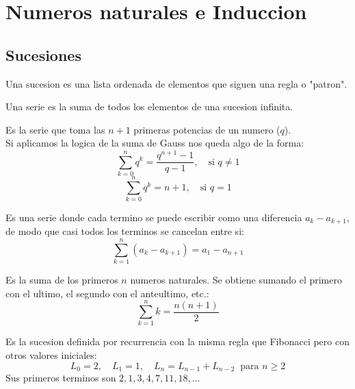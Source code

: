 \chapter{Numeros naturales e Induccion}

\section{Sucesiones}

\begin{definicion}[title= Definicion de sucesion]
    Una sucesion es una lista ordenada de elementos que siguen una regla o "patron".
\end{definicion}

\begin{definicion}[title= Definicion de serie]
    Una serie es la suma de todos los elementos de una sucesion infinita.
\end{definicion}

\begin{definicion}[title= Definicion de serie geometrica]
    Es la serie que toma las $n+1$ primeras potencias de un numero ($q$). \\
    Si aplicamos la logica de la suma de Gauss nos queda algo de la forma:
\[
    \sum_{k=0}^{n} q^k = \frac{q^{n+1}-1}{q-1}, \quad \text{si } q\neq 1
\]
\[
    \sum_{k=0}^{n} q^k = n+1, \quad \text{si } q=1
\]
\end{definicion}

\begin{definicion}[title= Definicion de serie telescopica]
    Es una serie donde cada termino se puede escribir como una diferencia $a_k - a_{k+1}$, de modo que casi todos los terminos se cancelan entre si:
\[
    \sum_{k=1}^{n} (a_k - a_{k+1}) = a_1 - a_{n+1}
\]
\end{definicion}

\begin{definicion}[title= Definicion suma de Gauss]
    Es la suma de los primeros $n$ numeros naturales. Se obtiene sumando el primero con el ultimo, el segundo con el anteultimo, etc.:
\[
    \sum_{k=1}^{n} k = \frac{n(n+1)}{2}
\]
\end{definicion}

\begin{definicion}[title= Definicion sucesion de Lucas]
    Es la sucesion definida por recurrencia con la misma regla que Fibonacci pero con otros valores iniciales:
\[
    L_0 = 2, \quad L_1 = 1, \quad L_{n} = L_{n-1} + L_{n-2} \ \text{ para } n\geq 2
\]
    Sus primeros terminos son $2, 1, 3, 4, 7, 11, 18, \dots$
\end{definicion}

